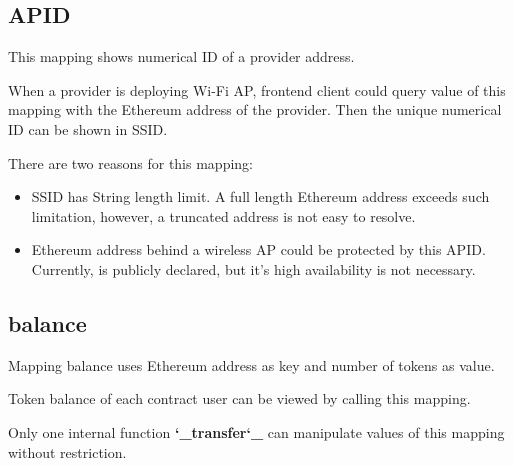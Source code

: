 \documentclass[letterpaper,10pt,english]{sphinxmanual}
\begin{document}
\subsection{APID}
\label{\detokenize{ContractVariables:apid}}
%
\begin{sphinxVerbatim}[commandchars=\\\{\}]
     
\end{sphinxVerbatim}

This mapping shows numerical ID of a provider address.

When a provider is deploying Wi-Fi AP, frontend client could
query value of this mapping with the Ethereum address
of the provider. Then the unique numerical ID can be shown in SSID.

There are two reasons for this mapping:
\begin{itemize}
\item {} 
SSID has String length limit. A full length Ethereum address exceeds such limitation, however, a truncated address is not easy to resolve.

\item {} 
Ethereum address behind a wireless AP could be protected by this APID. Currently, {\hyperref[\detokenize{ContractVariables:providerbehind}]{}} is publicly declared, but it’s high availability is not necessary.

\end{itemize}


\subsection{balance}
\label{\detokenize{ContractVariables:balance}}
%
\begin{sphinxVerbatim}[commandchars=\\\{\}]
     
\end{sphinxVerbatim}

Mapping balance uses Ethereum address as key and number of tokens as value.

Token balance of each contract user can be viewed by calling this mapping.

Only one internal function {\color{red}\bfseries{}{}`\_transfer{}`\_} can manipulate values of this mapping without restriction.
\end{document}
